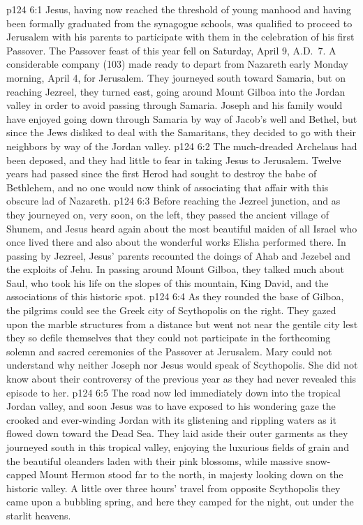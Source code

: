 \vs p124 6:1 Jesus, having now reached the threshold of young manhood and having been formally graduated from the synagogue schools, was qualified to proceed to Jerusalem with his parents to participate with them in the celebration of his first Passover. The Passover feast of this year fell on Saturday, April 9, A.D.~7. A considerable company (103) made ready to depart from Nazareth early Monday morning, April 4, for Jerusalem. They journeyed south toward Samaria, but on reaching Jezreel, they turned east, going around Mount Gilboa into the Jordan valley in order to avoid passing through Samaria. Joseph and his family would have enjoyed going down through Samaria by way of Jacob’s well and Bethel, but since the Jews disliked to deal with the Samaritans, they decided to go with their neighbors by way of the Jordan valley.
\vs p124 6:2 The much\hyp{}dreaded Archelaus had been deposed, and they had little to fear in taking Jesus to Jerusalem. Twelve years had passed since the first Herod had sought to destroy the babe of Bethlehem, and no one would now think of associating that affair with this obscure lad of Nazareth.
\vs p124 6:3 Before reaching the Jezreel junction, and as they journeyed on, very soon, on the left, they passed the ancient village of Shunem, and Jesus heard again about the most beautiful maiden of all Israel who once lived there and also about the wonderful works Elisha performed there. In passing by Jezreel, Jesus’ parents recounted the doings of Ahab and Jezebel and the exploits of Jehu. In passing around Mount Gilboa, they talked much about Saul, who took his life on the slopes of this mountain, King David, and the associations of this historic spot.
\vs p124 6:4 As they rounded the base of Gilboa, the pilgrims could see the Greek city of Scythopolis on the right. They gazed upon the marble structures from a distance but went not near the gentile city lest they so defile themselves that they could not participate in the forthcoming solemn and sacred ceremonies of the Passover at Jerusalem. Mary could not understand why neither Joseph nor Jesus would speak of Scythopolis. She did not know about their controversy of the previous year as they had never revealed this episode to her.
\vs p124 6:5 The road now led immediately down into the tropical Jordan valley, and soon Jesus was to have exposed to his wondering gaze the crooked and ever\hyp{}winding Jordan with its glistening and rippling waters as it flowed down toward the Dead Sea. They laid aside their outer garments as they journeyed south in this tropical valley, enjoying the luxurious fields of grain and the beautiful oleanders laden with their pink blossoms, while massive snow\hyp{}capped Mount Hermon stood far to the north, in majesty looking down on the historic valley. A little over three hours’ travel from opposite Scythopolis they came upon a bubbling spring, and here they camped for the night, out under the starlit heavens.
